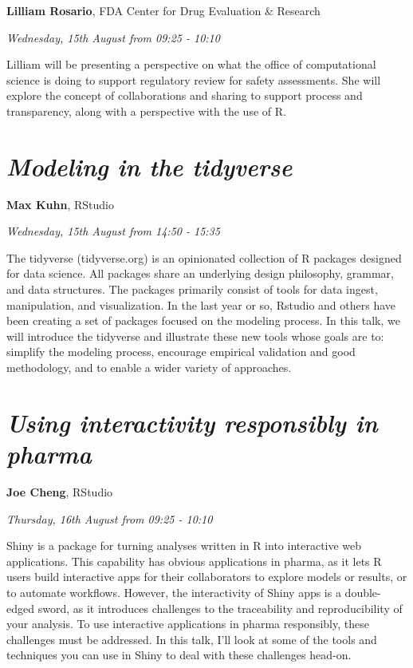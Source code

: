 \documentclass[]{book}
\theoremstyle{definition}
\theoremstyle{definition}
\theoremstyle{definition}
\theoremstyle{remark}
\begin{document}
\textbf{Lilliam Rosario}, FDA Center for Drug Evaluation \& Research

\emph{Wednesday, 15th August from 09:25 - 10:10}

Lilliam will be presenting a perspective on what the office of
computational science is doing to support regulatory review for safety
assessments. She will explore the concept of collaborations and sharing
to support process and transparency, along with a perspective with the
use of R.

\hypertarget{modeling-in-the-tidyverse}{%
\section{\texorpdfstring{\emph{Modeling in the
tidyverse}}{Modeling in the tidyverse}}\label{modeling-in-the-tidyverse}}

\textbf{Max Kuhn}, RStudio

\emph{Wednesday, 15th August from 14:50 - 15:35}

The tidyverse (tidyverse.org) is an opinionated collection of R packages
designed for data science. All packages share an underlying design
philosophy, grammar, and data structures. The packages primarily consist
of tools for data ingest, manipulation, and visualization. In the last
year or so, Rstudio and others have been creating a set of packages
focused on the modeling process. In this talk, we will introduce the
tidyverse and illustrate these new tools whose goals are to: simplify
the modeling process, encourage empirical validation and good
methodology, and to enable a wider variety of approaches.

\hypertarget{using-interactivity-responsibly-in-pharma}{%
\section{\texorpdfstring{\emph{Using interactivity responsibly in
pharma}}{Using interactivity responsibly in pharma}}\label{using-interactivity-responsibly-in-pharma}}

\textbf{Joe Cheng}, RStudio

\emph{Thursday, 16th August from 09:25 - 10:10}

Shiny is a package for turning analyses written in R into interactive
web applications. This capability has obvious applications in pharma, as
it lets R users build interactive apps for their collaborators to
explore models or results, or to automate workflows. However, the
interactivity of Shiny apps is a double-edged sword, as it introduces
challenges to the traceability and reproducibility of your analysis. To
use interactive applications in pharma responsibly, these challenges
must be addressed. In this talk, I'll look at some of the tools and
techniques you can use in Shiny to deal with these challenges head-on.
\end{document}

